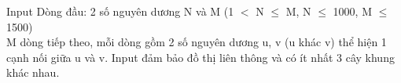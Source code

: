 Input
Dòng đầu: 2 số nguyên dương N và M (1 $<$ N  $\le$  M, N  $\le$  1000, M  $\le$  1500)
\\M dòng tiếp theo, mỗi dòng gồm 2 số nguyên dương u, v (u khác v) thể hiện 1 cạnh nối giữa u và v. Input đảm bảo đồ thị liên thông và có ít nhất 3 cây khung khác nhau.
